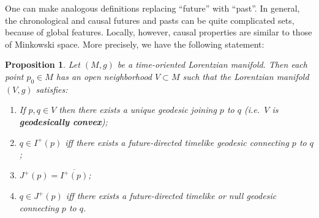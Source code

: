 \documentclass[12pt]{amsart}
\newtheorem{Prop}[Thm]{Proposition}
\theoremstyle{definition}
\theoremstyle{remark}
\begin{document}
One can make analogous definitions replacing ``future'' with ``past''. In general, the chronological and causal futures and pasts can be quite complicated sets, because of global features. Locally, however, causal properties are similar to those of Minkowski space. More precisely, we have the following statement:

\begin{Prop} \label{prop7.7.1}
Let $(M,g)$ be a time-oriented Lorentzian manifold. Then each point $p_0\in M$ has an open neighborhood $V \subset M$ such that the Lorentzian manifold $(V,g)$ satisfies:
\begin{enumerate}
\item If $p,q \in V$ then there exists a unique geodesic joining $p$ to $q$ (i.e.~$V$ is {\bf geodesically convex});
\item $q\in I^+(p)$ iff there exists a future-directed timelike geodesic connecting $p$ to $q$;
\item $J^+(p) = \overline{I^+(p)}$;
\item $q \in J^+(p)$ iff there exists a future-directed timelike or null geodesic connecting $p$ to $q$.
\end{enumerate}
\end{Prop}
\end{document}
